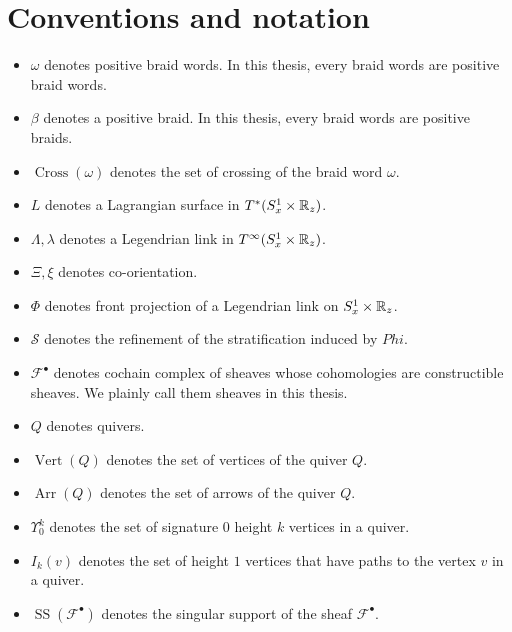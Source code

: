 \section*{Conventions and notation}\label{sec_conventions}
\begin{itemize}
\item $\omega$ denotes positive braid words. In this thesis, every braid words are positive braid words.

\item $\beta$ denotes a positive braid. In this thesis, every braid words are positive braids.

\item $\operatorname{Cross}(\omega)$ denotes the set of crossing of the braid word $\omega$.

\item $L$ denotes a Lagrangian surface in $T^*(S^1_x\times \mathbb{R}_z)$.

\item $\Lambda,\lambda$ denotes a Legendrian link in $T^\infty(S^1_x\times \mathbb{R}_z)$.

\item $\Xi,\xi$ denotes co-orientation.

\item $\Phi$ denotes front projection of a Legendrian link on $S^1_x \times \mathbb{R}_z$.

\item $\mathcal{S}$ denotes the refinement of the stratification induced by $Phi$.

\item $\mathscr{F}^\bullet$ denotes cochain complex of sheaves whose cohomologies are constructible sheaves. We plainly call them sheaves in this thesis.

\item $Q$ denotes quivers.

\item $\operatorname{Vert}(Q)$ denotes the set of vertices of the quiver $Q$.

\item $\operatorname{Arr}(Q)$ denotes the set of arrows of the quiver $Q$.

\item $\Upsilon^k_0$ denotes the set of signature $0$ height $k$ vertices in a quiver.

\item $I_k(v)$ denotes the set of height $1$ vertices that have paths to the vertex $v$ in a quiver.

\item $\operatorname{SS}(\mathscr{F}^\bullet)$ denotes the singular support of the sheaf $\mathscr{F}^\bullet$.


\end{itemize}
